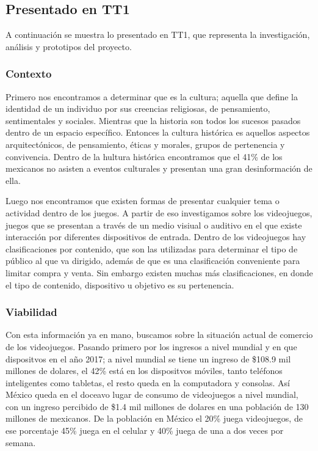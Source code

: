 \subsection{Presentado en TT1}\label{tt1}
A continuación se muestra lo presentado en TT1, que representa la investigación, análisis y prototipos del proyecto.

\subsubsection{Contexto}\label{contexto}
Primero nos encontramos a determinar que es la cultura; aquella que define la identidad de un individuo por sus creencias religiosas, de pensamiento, sentimentales y sociales. Mientras que la historia son todos los sucesos pasados dentro de un espacio específico. Entonces la cultura histórica es aquellos aspectos arquitectónicos, de pensamiento, éticas y morales, grupos de pertenencia y convivencia. Dentro de la hultura histórica encontramos que el 41\% de los mexicanos no asisten a eventos culturales y presentan una gran desinformación de ella.

Luego nos encontramos que existen formas de presentar cualquier tema o actividad dentro de los juegos. A partir de eso investigamos sobre los videojuegos, juegos que se presentan a través de un medio visiual o auditivo en el que existe interacción por diferentes dispositivos de entrada. Dentro de los videojuegos hay clasificaciones por contenido, que son las utilizadas para determinar el tipo de público al que va dirigido, además de que es una clasificación conveniente para limitar compra y venta. Sin embargo existen muchas más clasificaciones, en donde el tipo de contenido, dispositivo u objetivo es su pertenencia.

\subsubsection{Viabilidad}\label{viabilidad}
Con esta información ya en mano, buscamos sobre la situación actual de comercio de los videojuegos. Pasando primero por los ingresos a nivel mundial y en que dispositvos en el año 2017; a nivel mundial se tiene un ingreso de \$108.9 mil millones de dolares, el 42\% está en los dispositvos móviles, tanto teléfonos inteligentes como tabletas, el resto queda en la computadora y consolas. Así México queda en el doceavo lugar de consumo de videojuegos a nivel mundial, con un ingreso percibido de \$1.4 mil millones de dolares en una población de 130 millones de mexicanos. De la población en México el 20\% juega videojuegos, de ese porcentaje 45\% juega en el celular y 40\% juega de una a dos veces por semana.

